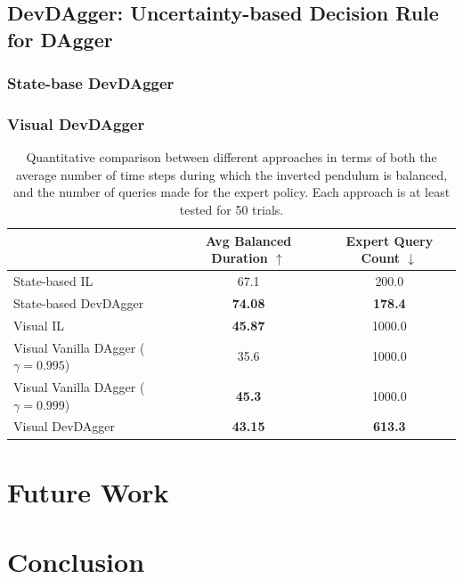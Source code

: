 \documentclass[11pt, reqno, letterpaper, twoside]{amsart}
\begin{document}
\subsection{DevDAgger: Uncertainty-based Decision Rule for DAgger}

\subsubsection{State-base DevDAgger}

\subsubsection{Visual DevDAgger}


\begin{table}[ht]
    \centering
    \begin{tabular}{|l|c|c|}
        \hline
                                & Avg Balanced Duration $\uparrow$ & Expert Query Count $\downarrow$\\
        \hline
        State-based IL          & 67.1 & 200.0  \\
        \hline
        State-based DevDAgger   & \textbf{74.08} & \textbf{178.4}  \\
        \hhline{|=|=|=|}
        Visual IL               & \textbf{45.87} & 1000.0  \\
        \hline
        Visual Vanilla DAgger ($\gamma = 0.995$) & 35.6 & 1000.0  \\
        \hline
        Visual Vanilla DAgger ($\gamma = 0.999$) & \textbf{45.3} & 1000.0  \\
        \hline
        Visual DevDAgger        & \textbf{43.15} & \textbf{613.3} \\
        \hline
    \end{tabular}
    \caption{Quantitative comparison between different approaches in terms of both the average number of time steps during which the inverted pendulum is balanced, and the number of queries made for the expert policy. Each approach is at least tested for 50 trials.}
    \label{tab:comparison}
\end{table}

\section{Future Work}


\section{Conclusion}


{


}
\end{document}
